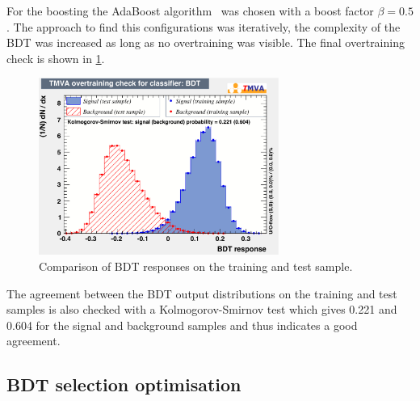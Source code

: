 For the boosting the AdaBoost algorithm~\cite{AdaBoost} was chosen with a boost factor $\beta=0.5$.
The approach to find this configurations was iteratively, \ie the complexity of the \ac{BDT} was increased as long as no overtraining was visible.
The final overtraining check is shown in \cref{fig:BDTOVertraining}.
\begin{figure}[tbp]
    \centering
    \includegraphics[width=0.7\textwidth]{06selection/figs/overtrain_BDT.pdf}
    \caption{Comparison of \ac{BDT} responses on the training and test sample.}
    \label{fig:BDTOVertraining}
\end{figure}
The agreement between the \ac{BDT} output distributions on the training and test samples is also checked with a Kolmogorov-Smirnov test which gives \num{0.221} and \num{0.604} for the signal and background samples and thus indicates a good agreement.

\subsection{BDT selection optimisation}
\label{sec:BDTOpt}

